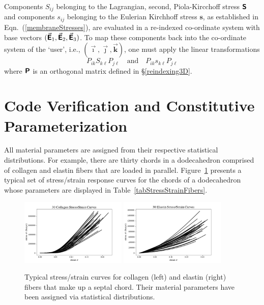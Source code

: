 Components $S_{ij}$ belonging to the Lagrangian, second, Piola-Kircchoff stress $\boldsymbol{\mathsf{S}}$ and components $s_{ij}$ belonging to the Eulerian Kirchhoff stress $\boldsymbol{s}$, as established in Eqn.~(\ref{membraneStresses}), are evaluated in a re-indexed co-ordinate system with base vectors $( \vec{\boldsymbol{\mathsf{E}}}_1 , \vec{\boldsymbol{\mathsf{E}}}_2 , \vec{\boldsymbol{\mathsf{E}}}_3 )$.  To map these components back into the co-ordinate system of the `user', i.e., $( \vec{\boldsymbol{\imath}} , \vec{\boldsymbol{\jmath}} , \vec{\boldsymbol{k}} )$, one must apply the linear transformations
\begin{displaymath}
P_{ik} S_{k\ell} P_{j\ell}
\quad \text{and} \quad
P_{ik} s_{k\ell} P_{j\ell} 
\end{displaymath}
where $\boldsymbol{\mathsf{P}}$ is an orthogonal matrix defined in \S\ref{reindexing3D}.

\section{Code Verification and Constitutive Parameterization}
\label{secCE_verifyCode}

All material parameters are assigned from their respective statistical distributions.  For example, there are thirty chords in a dodecahedron comprised of collagen and elastin fibers that are loaded in parallel.  Figure~\ref{figStressStrainFibers} presents a typical set of stress\slash strain response curves for the chords of a dodecahedron whose parameters are displayed in Table~\ref{tabStressStrainFibers}.

\begin{figure}
    \centering
    \includegraphics[width=0.45\textwidth]{figures/collagenStressStrain.jpg}
    \includegraphics[width=0.45\textwidth]{figures/elastinStressStrain.jpg}
    \caption{Typical stress\slash strain curves for collagen (left) and elastin (right) fibers that make up a septal chord.  Their material parameters have been assigned via statistical distributions.}
    \label{figStressStrainFibers}
\end{figure}

